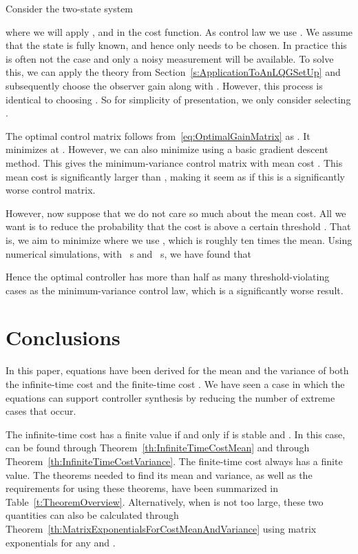 \documentclass[twocolumn]{autart}
\begin{document}
Consider the two-state system

where we will apply ,  and  in the cost function. As control law we use . We assume that the state  is fully known, and hence only  needs to be chosen. In practice this is often not the case and only a noisy measurement  will be available. To solve this, we can apply the theory from Section~\ref{s:ApplicationToAnLQGSetUp} and subsequently choose the observer gain  along with . However, this process is identical to choosing . So for simplicity of presentation, we only consider selecting .

The optimal control matrix follows from~\eqref{eq:OptimalGainMatrix} as . It minimizes  at . However, we can also minimize  using a basic gradient descent method. This gives the minimum-variance control matrix  with mean cost . This mean cost is significantly larger than , making it seem as if this is a significantly worse control matrix.

However, now suppose that we do not care so much about the mean cost. All we want is to reduce the probability that the cost  is above a certain threshold . That is, we aim to minimize  where we use , which is roughly ten times the mean. Using  numerical simulations, with \mbox{ s} and \mbox{ s}, we have found that

Hence the optimal controller has more than half as many threshold-violating cases as the minimum-variance control law, which is a significantly worse result. 

\section{Conclusions} \label{s:ConclusionsAndRecommendations}

In this paper, equations have been derived for the mean and the variance of both the infinite-time cost  and the finite-time cost . We have seen a case in which the equations can support controller synthesis by reducing the number of extreme cases that occur.

The infinite-time cost  has a finite value if and only if  is stable and . In this case,  can be found through Theorem~\ref{th:InfiniteTimeCostMean} and  through Theorem~\ref{th:InfiniteTimeCostVariance}. The finite-time cost  always has a finite value. The theorems needed to find its mean and variance, as well as the requirements for using these theorems, have been summarized in Table~\ref{t:TheoremOverview}. Alternatively, when  is not too large, these two quantities can also be calculated through Theorem~\ref{th:MatrixExponentialsForCostMeanAndVariance} using matrix exponentials for any  and .
\end{document}

